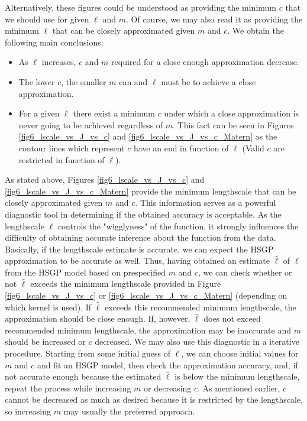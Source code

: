 \documentclass[onecolumn,a4paper,11pt]{article}
\begin{document}
\noindent Alternatively, these figures could be understood as providing the minimum $c$ that we should use for given $\ell$ and $m$. Of course, we may also read it as providing the minimum $\ell$ that can be closely approximated given $m$ and $c$. We obtain the following main conclusions:

\begin{itemize}
\item As $\ell$ increases, $c$ and $m$ required for a close enough approximation decrease.
\item The lower $c$, the smaller $m$ can and $\ell$ must be to achieve a close approximation.
\item For a given $\ell$ there exist a minimum $c$ under which a close approximation is never going to be achieved regardless of $m$. This fact can be seen in Figures \ref{fig6_lscale_vs_J_vs_c} and \ref{fig6_lscale_vs_J_vs_c_Matern} as the contour lines which represent $c$ have an end in function of $\ell$ (Valid $c$ are restricted in function of $\ell$).
\end{itemize}

As stated above, Figures \ref{fig6_lscale_vs_J_vs_c} and \ref{fig6_lscale_vs_J_vs_c_Matern} provide the minimum lengthscale that can be closely approximated given $m$ and $c$. This information serves as a powerful diagnostic tool in determining if the obtained accuracy is acceptable. As the lengthscale $\ell$ controls the "wigglyness" of
the function, it strongly influences the difficulty of obtaining accurate
inference about the function from the data. Basically, if the lengthscale estimate is accurate, 
we can expect the HSGP approximation to be accurate as well. Thus, having obtained an estimate $\hat{\ell}$ of $\ell$ from the HSGP model based on prespecified $m$ and $c$, we can check whether or not $\hat{\ell}$ exceeds the minimum lengthscale provided in Figure \ref{fig6_lscale_vs_J_vs_c} or \ref{fig6_lscale_vs_J_vs_c_Matern} (depending on which kernel is used). If $\hat{\ell}$ exceeds this recommended minimum lengthscale, the approximation should be close enough. If, however, $\hat{\ell}$ does not exceed recommended minimum lengthscale, the approximation may be inaccurate and $m$ should be increased or $c$ decreased. We may also use this diagnostic in a iterative procedure.
Starting from some initial guess of $\ell$, we can choose initial values for $m$ and $c$ and fit an HSGP model, then check the approximation accuracy, and, if not accurate enough because the estimated $\hat{\ell}$ is below the minimum lengthscale, repeat the process while increasing $m$ or decreasing $c$.
As mentioned earlier, $c$ cannot be decreased as much as desired because it is restricted by the lengthscale, so increasing $m$ may usually the preferred approach.
\end{document}
